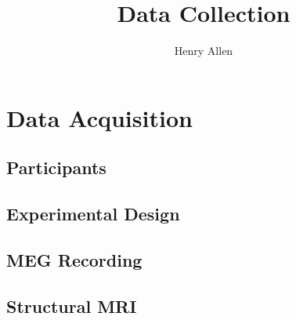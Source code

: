 \documentclass[12pt]{article}
\title{Data Collection}
\author{Henry Allen}
\begin{document}
\maketitle

\section{Data Acquisition}
\subsection{Participants}

\subsection{Experimental Design}

\subsection{MEG Recording}

\subsection{Structural MRI}
    
\end{document}
